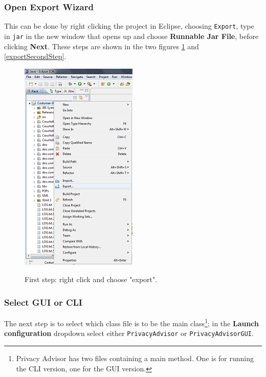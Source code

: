 \subsubsection{Open Export Wizard}
This can be done by right clicking the project in Eclipse, choosing \texttt{Export}, type in \texttt{jar} in the new window that opens up and choose \textbf{Runnable Jar File}, before clicking \textbf{Next}. These steps are shown in the two figures \ref{exportFirstStep} and \ref{exportSecondStep}.

\begin{figure}[h!]
  \vspace{-10pt}
  \begin{centering}
    \includegraphics[width = .6\textwidth]{Documentation/export.png}
    \vspace{-10pt}
    \caption{First step: right click and choose "export".}
    \vspace{-10pt}
    \label{exportFirstStep}
    \end{centering}
  \end{figure}

  \subsubsection{Select GUI or CLI}
  The next step is to select which class file is to be the main class\footnote{Privacy Advisor has two files containing a main method. One is for running the CLI version, one for the GUI version.}; in the \textbf{Launch configuration} dropdown select either \texttt{PrivacyAdvisor} or \texttt{PrivacyAdvisorGUI}.

